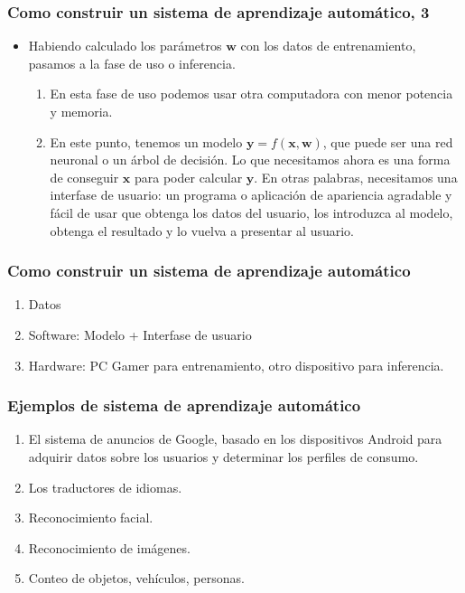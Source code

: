 \documentclass[11pt]{beamer}
\begin{document}
    \begin{frame}
	\frametitle{Como construir un sistema de aprendizaje automático, 3}
	
	\begin{itemize}
		\item Habiendo calculado los parámetros $\mathbf{w}$ con los datos de entrenamiento, pasamos a la fase de uso o inferencia. 
		\begin{enumerate}
			\item En esta fase de uso podemos usar otra computadora con menor potencia y memoria.
			\item En este punto, tenemos un modelo $\mathbf{y} = f(\mathbf{x}, \mathbf{w})$, que puede ser una red neuronal o un árbol de decisión.
			Lo que necesitamos ahora es una forma de conseguir $\mathbf{x}$ para poder calcular $\mathbf{y}$. En otras palabras, necesitamos una interfase de usuario: un programa o aplicación de apariencia agradable y fácil de usar que obtenga los datos del usuario, los introduzca al modelo, obtenga el resultado y lo vuelva a presentar al usuario.
		\end{enumerate}
	\end{itemize}
    \end{frame} 
    \begin{frame}
	\frametitle{Como construir un sistema de aprendizaje automático}
	\begin{enumerate}
		\item Datos
		\item Software: Modelo + Interfase de usuario
		\item Hardware: PC Gamer para entrenamiento, otro dispositivo para inferencia.
	\end{enumerate}
    \end{frame}
    \begin{frame}
	\frametitle{Ejemplos de sistema de aprendizaje automático}
	\begin{enumerate}
		\item El sistema de anuncios de Google, basado en los dispositivos Android para adquirir datos sobre los usuarios y determinar los perfiles de consumo.
		\item Los traductores de idiomas.
		\item Reconocimiento facial.
		\item Reconocimiento de imágenes.
		\item Conteo de objetos, vehículos, personas.
	\end{enumerate}
    \end{frame}
\end{document}
